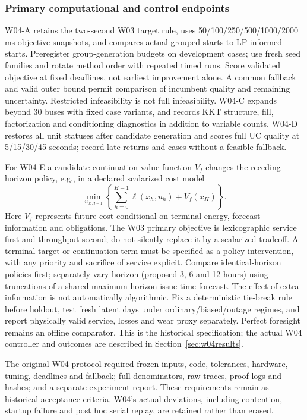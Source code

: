 \documentclass[11pt,letterpaper]{article}
\begin{document}
\subsubsection{Primary computational and control endpoints}
W04-A retains the two-second W03 target rule, uses 50/100/250/500/1000/2000 ms objective snapshots, and compares actual grouped starts to LP-informed starts. Preregister group-generation budgets on development cases; use fresh seed families and rotate method order with repeated timed runs. Score validated objective at fixed deadlines, not earliest improvement alone. A common fallback and valid outer bound permit comparison of incumbent quality and remaining uncertainty. Restricted infeasibility is not full infeasibility. W04-C expands beyond 30 buses with fixed case variants, and records KKT structure, fill, factorization and conditioning diagnostics in addition to variable counts. W04-D restores all unit statuses after candidate generation and scores full UC quality at 5/15/30/45 seconds; record late returns and cases without a feasible fallback.

For W04-E a candidate continuation-value function $V_f$ changes the receding-horizon policy, e.g., in a declared scalarized cost model
\[
 \min_{u_{0:H-1}}\left\{\sum_{h=0}^{H-1}\ell(x_h,u_h)+V_f(x_H)\right\}.
\]
Here $V_f$ represents future cost conditional on terminal energy, forecast information and obligations. The W03 primary objective is lexicographic service first and throughput second; do not silently replace it by a scalarized tradeoff. A terminal target or continuation term must be specified as a policy intervention, with any priority and sacrifice of service explicit. Compare identical-horizon policies first; separately vary horizon (proposed 3, 6 and 12 hours) using truncations of a shared maximum-horizon issue-time forecast. The effect of extra information is not automatically algorithmic. Fix a deterministic tie-break rule before holdout, test fresh latent days under ordinary/biased/outage regimes, and report physically valid service, losses and wear proxy separately. Perfect foresight remains an offline comparator. This is the historical specification; the actual W04 controller and outcomes are described in Section~\ref{sec:w04results}.

The original W04 protocol required frozen inputs, code, tolerances, hardware, tuning, deadlines and fallback; full denominators, raw traces, proof logs and hashes; and a separate experiment report. These requirements remain as historical acceptance criteria. W04's actual deviations, including contention, startup failure and post hoc serial replay, are retained rather than erased.
\end{document}
